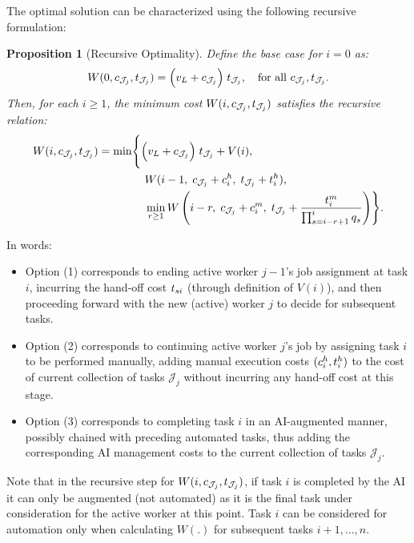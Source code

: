 \documentclass{article}
\theoremstyle{plain}
\theoremstyle{plain}
\newtheorem{proposition}[theorem]{Proposition}
\begin{document}
The optimal solution can be characterized using the following recursive formulation:
\begin{proposition}[Recursive Optimality]
\label{prop:recursive_optimality}
Define the base case for $i=0$ as:
\[
W(0, c_{\mathcal{J}_j}, t_{\mathcal{J}_j}) 
= \Bigl(v_L + c_{\mathcal{J}_j} \Bigr) \; t_{\mathcal{J}_j}, 
\quad\text{for all $c_{\mathcal{J}_j}, t_{\mathcal{J}_j}$}.
\]
Then, for each $i \geq 1$, the minimum cost $W(i, c_{\mathcal{J}_j}, t_{\mathcal{J}_j})$ satisfies the recursive relation:
\begin{align*}
W(i, c_{\mathcal{J}_j}, t_{\mathcal{J}_j}) 
= \min\Biggl\{ 
& \Bigl(v_L + c_{\mathcal{J}_j} \Bigr) \; t_{\mathcal{J}_j} + V(i), \\
& \ W(i-1,\; c_{\mathcal{J}_j} + c^{h}_{i},\; t_{\mathcal{J}_j} + t^{h}_{i}), \\
& \ \min_{r \geq 1} W\left(i - r,\; c_{\mathcal{J}_j} + c^{m}_{i},\; t_{\mathcal{J}_j} + \frac{t^{m}_{i}}{\prod_{s=i-r+1}^{i} q_s}\right)
\Biggr\}.
\end{align*}
\end{proposition}
In words:
\begin{itemize}
    \item Option (1) corresponds to ending active worker $j-1$'s job assignment at task $i$, incurring the hand-off cost $t_{si}$ (through definition of $V(i)$), and then proceeding forward with the new (active) worker $j$ to decide for subsequent tasks.
    \item Option (2) corresponds to continuing active worker $j$'s job by assigning task $i$ to be performed manually, adding manual execution costs $(c^{h}_{i}, t^{h}_{i})$ to the cost of current collection of tasks $\mathcal{J}_j$ without incurring any hand-off cost at this stage.
    \item Option (3) corresponds to completing task $i$ in an AI-augmented manner, possibly chained with preceding automated tasks, thus adding the corresponding AI management costs to the current collection of tasks $\mathcal{J}_j$.
\end{itemize}

Note that in the recursive step for $W(i, c_{\mathcal{J}_j}, t_{\mathcal{J}_j})$, if task $i$ is completed by the AI it can only be augmented (not automated) as it is the final task under consideration for the active worker at this point. 
Task $i$ can be considered for automation only when calculating $W(.)$ for subsequent tasks $i+1, \dots, n$.
\end{document}
